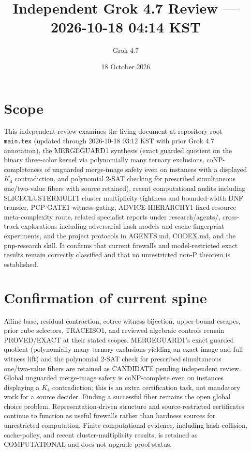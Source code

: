 \documentclass[11pt]{article}
\title{Independent Grok 4.7 Review --- 2026-10-18 04:14 KST}
\author{Grok 4.7}
\date{18 October 2026}
\begin{document}
\maketitle

\begin{center}
\end{center}

\section{Scope}
This independent review examines the living document at repository-root \texttt{main.tex} (updated through 2026-10-18 03:12 KST with prior Grok 4.7 annotation), the MERGEGUARD1 synthesis (exact guarded quotient on the binary three-color kernel via polynomially many ternary exclusions, coNP-completeness of unguarded merge-image safety even on instances with a displayed $K_4$ contradiction, and polynomial 2-SAT checking for prescribed simultaneous one/two-value fibers with source retained), recent computational audits including SLICECLUSTERMULT1 cluster multiplicity tightness and bounded-width DNF transfer, PCP-GATE1 witness-gating, ADVICE-HIERARCHY1 fixed-resource meta-complexity route, related specialist reports under research/agents/, cross-track explorations including adversarial hash models and cache fingerprint experiments, and the project protocols in AGENTS.md, CODEX.md, and the pnp-research skill. It confirms that current firewalls and model-restricted exact results remain correctly classified and that no unrestricted non-P theorem is established.

\section{Confirmation of current spine}
Affine base, residual contraction, cotree witness bijection, upper-bound escapes, prior cube selectors, TRACEISO1, and reviewed algebraic controls remain PROVED/EXACT at their stated scopes. MERGEGUARD1's exact guarded quotient (polynomially many ternary exclusions yielding an exact image and full witness lift) and the polynomial 2-SAT check for prescribed simultaneous one/two-value fibers are retained as CANDIDATE pending independent review. Global unguarded merge-image safety is coNP-complete even on instances displaying a $K_4$ contradiction; this is an extra certification task, not mandatory work for a source decider. Finding a successful fiber remains the open global choice problem. Representation-driven structure and source-restricted certificates continue to function as useful firewalls rather than hardness sources for unrestricted computation. Finite computational evidence, including hash-collision, cache-policy, and recent cluster-multiplicity results, is retained as COMPUTATIONAL and does not upgrade proof status.
\end{document}
